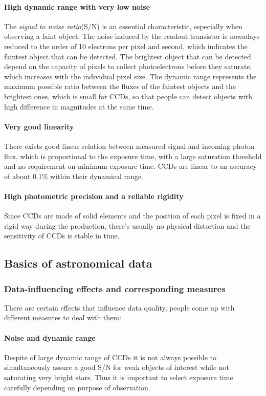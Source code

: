\paragraph{High dynamic range with very low noise}
  The \textit{signal to noise ratio}(S/N) is an essential characteristic, especially when observing a faint object. The noise induced by the readout transistor is nowadays reduced to the order of 10 electrons per pixel and second, which indicates the faintest object that can be detected. The brightest object that can be detected depend on the  capacity of pixels to collect photoelectrons before they saturate, which increases with the individual pixel size. The dynamic range represents the maximum possible ratio between the fluxes of the faintest objects and the brightest ones, which is small for CCDs, so that people can detect objects with high difference in magnitudes at the same time. 
  
\paragraph{Very good linearity}
  There exists good linear relation between measured signal and incoming photon flux, which is proportional to the exposure time, with a large saturation threshold and no requirement on minimum exposure time. CCDs are linear to an accuracy of about 0.1\% within their dynamical range.
  
\paragraph{High photometric precision and a reliable rigidity}
  Since CCDs are made of solid elements and the position of each pixel is fixed in a rigid way during the production, there's usually no physical distortion and the sensitivity of CCDs is stable in time.

\subsection{Basics of astronomical data} \label{astrodata}
\subsubsection{Data-influencing effects and corresponding measures}
There are certain effects that influence data quality, people come up with different measures to deal with them:
\paragraph{Noise and dynamic range}
Despite of large dynamic range of CCDs it is not always possible to simultaneously assure a good S/N for weak objects of interest while not saturating very bright stars. Thus it is important to select exposure time carefully depending on purpose of observation.

